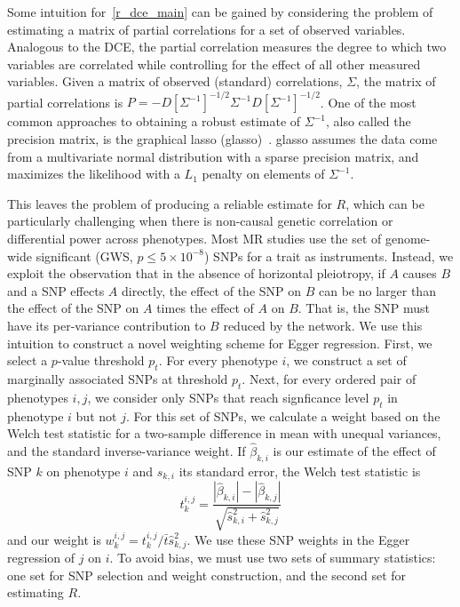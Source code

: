 \documentclass{article}
\begin{document}
Some intuition for~\eqref{r_dce_main} can be gained by considering the problem
of estimating a matrix of partial correlations for a set of observed variables.
Analogous to the DCE, the partial correlation measures the degree to which two
variables are correlated while controlling for the effect of all other measured
variables. Given a matrix of observed (standard) correlations, $\Sigma$, the matrix of
partial correlations is $P = -D[\Sigma^{-1}]^{-1/2} \Sigma^{-1} D[\Sigma^{-1}]^{-1/2}$. One of
the most common approaches to obtaining a robust estimate of $\Sigma^{-1}$, also called
the precision matrix, is the graphical lasso (glasso)~\cite{Friedman2007}.
glasso assumes the data come from a multivariate normal distribution with a sparse
precision matrix, and maximizes the likelihood with a $L_1$ penalty on elements of $\Sigma^{-1}$.

This leaves the problem of producing a reliable estimate for $R$,
which can be particularly challenging when there is non-causal genetic correlation or
differential power across phenotypes. Most MR studies use the set of
genome-wide significant (GWS, $p \le 5\times 10^{-8}$) SNPs for a trait as instruments.
Instead, we exploit the observation that in the absence of horizontal pleiotropy, 
if $A$ causes $B$ and a SNP effects $A$ directly,
the effect of the SNP on $B$ can be no larger than the effect of the SNP on $A$ times
the effect of $A$ on $B$. That is, the SNP must have its per-variance contribution to
$B$ reduced by the network. We use this intuition to construct a novel
weighting scheme for Egger regression.
First, we select a $p$-value threshold $p_t$. For every phenotype $i$, we
 construct a set of marginally associated SNPs at threshold $p_t$. Next,
 for every ordered pair of phenotypes $i, j$, we consider only SNPs that reach
 signficance level $p_t$ in phenotype $i$ but not $j$. For this set of SNPs, we calculate
 a weight based on the Welch test statistic for a two-sample difference in mean with unequal
 variances,
 and the standard inverse-variance weight. If $\hat{\beta}_{k, i}$ is our estimate
 of the effect of SNP $k$ on phenotype $i$ and $\hat{s}_{k, i}$ its standard error,
 the Welch test statistic is~\cite{Welch1947}
\begin{equation}
t^{i,j}_k = \frac{|\hat{\beta}_{k, i}| - |\hat{\beta}_{k, j}|}
  {\sqrt{\hat{s}^2_{k, i} + \hat{s}^2_{k, j}}}
\end{equation}
and our weight is $w^{i, j}_k = t^{i,j}_k/\bar{t} \hat{s}_{k, j}^2$.
We use these SNP weights in the Egger regression of $j$ on $i$.
To avoid bias, we must use two sets of summary
statistics: one set for SNP selection and weight construction,
 and the second set for estimating $R$.
\end{document}
